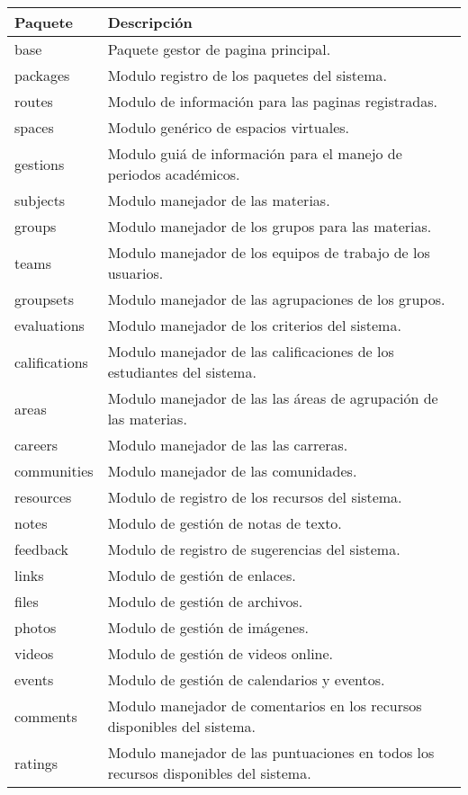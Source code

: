\begin{table}
\begin{tabular}{l|l}
Paquete & Descripción \\
\hline
base & Paquete gestor de pagina principal. \\
packages & Modulo registro de los paquetes del sistema. \\
routes & Modulo de información para las paginas registradas. \\
  spaces & Modulo genérico de espacios virtuales. \\
   gestions & Modulo guiá de información para el manejo de periodos académicos. \\
    subjects & Modulo manejador de las materias. \\
     groups & Modulo manejador de los grupos para las materias. \\
      teams & Modulo manejador de los equipos de trabajo de los usuarios. \\
      groupsets & Modulo manejador de las agrupaciones de los grupos. \\
      evaluations & Modulo manejador de los criterios del sistema. \\
       califications & Modulo manejador de las calificaciones de los estudiantes del sistema. \\
   areas & Modulo manejador de las las áreas de agrupación de las materias. \\
   careers & Modulo manejador de las las carreras. \\
   communities & Modulo manejador de las comunidades. \\
  resources & Modulo de registro de los recursos del sistema. \\
   notes & Modulo de gestión de notas de texto. \\
    feedback & Modulo de registro de sugerencias del sistema. \\
   links & Modulo de gestión de enlaces. \\
   files & Modulo de gestión de archivos. \\
    photos & Modulo de gestión de imágenes. \\
    videos & Modulo de gestión de videos online. \\
   events & Modulo de gestión de calendarios y eventos. \\
   comments & Modulo manejador de comentarios en los recursos disponibles del sistema. \\
   ratings & Modulo manejador de las puntuaciones en todos los recursos disponibles del sistema. \\

\end{tabular}
\end{table}

